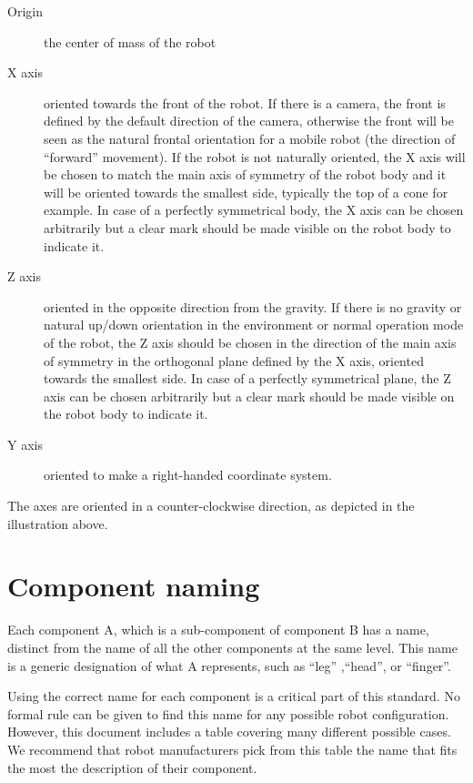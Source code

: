 \begin{description}
\item[Origin] the center of mass of the robot
\item[X axis] oriented towards the front of the robot. If there is a camera,
  the front is defined by the default direction of the camera, otherwise the
  front will be seen as the natural frontal orientation for a mobile robot
  (the direction of ``forward'' movement). If the robot is not naturally
  oriented, the X axis will be chosen to match the main axis of symmetry of
  the robot body and it will be oriented towards the smallest side,
  typically the top of a cone for example. In case of a perfectly
  symmetrical body, the X axis can be chosen arbitrarily but a clear mark
  should be made visible on the robot body to indicate it.
\item[Z axis] oriented in the opposite direction from the gravity. If there
  is no gravity or natural up/down orientation in the environment or normal
  operation mode of the robot, the Z axis should be chosen in the direction
  of the main axis of symmetry in the orthogonal plane defined by the X
  axis, oriented towards the smallest side. In case of a perfectly
  symmetrical plane, the Z axis can be chosen arbitrarily but a clear mark
  should be made visible on the robot body to indicate it.
\item[Y axis] oriented to make a right-handed coordinate system.
\end{description}


The axes are oriented in a counter-clockwise direction, as depicted in
the illustration above.

\section{Component naming}

Each component A, which is a sub-component of component B has a name, distinct
from the name of all the other components at the same level.
This name is a generic designation of what A represents, such as ``leg''
,``head'', or ``finger''.

Using the correct name for each component is a critical part of this standard.
No formal rule can be given to find this name for any possible robot
configuration. However, this document includes a table covering many different
possible cases. We recommend that robot manufacturers pick from this table
the name that fits the most the description of their component.

